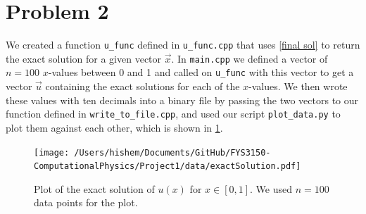 \documentclass[english,notitlepage]{revtex4-1}  %
\begin{document}
\section*{Problem 2}
We created a function \verb|u_func| defined in \verb|u_func.cpp| that uses \cref{final sol} to return the exact solution for a given vector $\vec{x}$. In \verb|main.cpp| we defined a vector of $n=100$  $x$-values between 0 and 1 and called on \verb|u_func| with this vector to get a vector $\vec{u}$ containing the exact solutions for each of the $x$-values. We then wrote these values with ten decimals into a binary file by passing the two vectors to our function defined in \verb|write_to_file.cpp|, and used our script \verb|plot_data.py| to plot them against each other, which is shown in \cref{plot_problem2}.
\begin{figure}[h!]
    \centering 
    \texttt{[image: /Users/hishem/Documents/GitHub/FYS3150-ComputationalPhysics/Project1/data/exactSolution.pdf]} %
    \caption{Plot of the exact solution of $u(x)$ for $x ∈ [0,1]$. We used $n =100$ data points for the plot.}
    \label{plot_problem2}
\end{figure}
\end{document}
